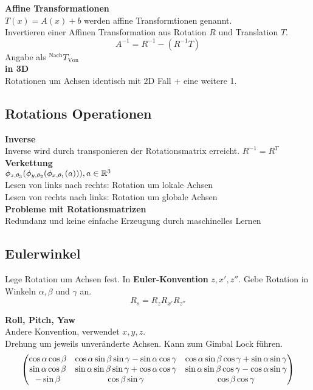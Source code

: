 \textbf{Affine Transformationen}\\
\(T(x) = A(x) + b\) werden affine Transformtionen genannt.\\
Invertieren einer Affinen Transformation aus Rotation \(R\) und Translation \(T\).
\[ A^{-1} = R^{-1} - (R^{-1} T)\]
Angabe als \({}^{\text{Nach}}T_{\text{Von}}\)\\

\textbf{in 3D}\\
Rotationen um Achsen identisch mit 2D Fall + eine weitere 1.

\subsection{Rotations Operationen}%
\label{math:sub:rotations-operationen}
\textbf{Inverse}\\
Inverse wird durch transponieren der Rotationsmatrix erreicht. \(R^{-1} = R^T\)\\

\textbf{Verkettung}\\
\(\phi_{z, \theta_3}(\phi_{y, \theta_2}(\phi_{x, \theta_1}(a))), a \in \mathbb{R}^3\)\\
Lesen von links nach rechts: Rotation um lokale Achsen\\
Lesen von rechts nach links: Rotation um globale Achsen\\

\textbf{Probleme mit Rotationsmatrizen}\\
Redundanz und keine einfache Erzeugung durch maschinelles Lernen

\subsection{Eulerwinkel}%
\label{math:sub:eulerwinkel}
Lege Rotation um Achsen fest. In \textbf{Euler-Konvention} \(z, x', z''\).
Gebe Rotation in Winkeln \(\alpha, \beta\) und \(\gamma\) an.
\[ R_s = R_z R_{x'} R_{z''}\]

\textbf{Roll, Pitch, Yaw}\\
Andere Konvention, verwendet \(x, y, z\).\\
Drehung um jeweils unveränderte Achsen.
Kann zum Gimbal Lock führen.\\
\[
  \begin{pmatrix}\cos \alpha \cos \beta & \cos \alpha \sin \beta \sin \gamma - \sin \alpha \cos \gamma & \cos \alpha \sin \beta \cos \gamma + \sin \alpha \sin \gamma\\
  \sin \alpha \cos \beta & \sin \alpha \sin \beta \sin \gamma + \cos \alpha \cos \gamma & \sin \alpha \sin \beta \cos \gamma - \cos \alpha \sin \gamma\\
  -\sin \beta &  \cos \beta \sin \gamma& \cos \beta \cos \gamma\end{pmatrix}
\]

